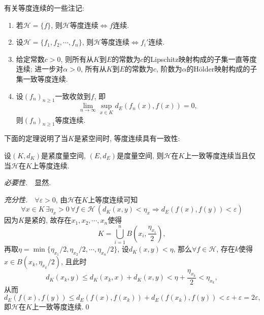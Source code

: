 	\begin{Remark}
	有关等度连续的一些注记:
	\begin{enumerate}[(1)]
	\item 若$ \mathcal H=\{f\} $, 则$ \mathcal H $等度连续$ \Longleftrightarrow f $连续.
	\item 设$ \mathcal H=\{ f_1,f_2,\cdots,f_n \} $, 则$ \mathcal H $等度连续$ \Longleftrightarrow f_i' $连续.
	\item 给定常数$ c>0 $, 则所有从$ K $到$ E $的常数为$ c $的Lipschitz映射构成的子集一直等度连续; 进一步对$ \alpha>0 $, 所有从$ K $到$ E $的常数为$ c $, 阶数为$ \alpha $的H\"older映射构成的子集一致等度连续.
	\item 设$ (f_n)_{n\geqslant 1} $一致收敛到$ f $, 即
	\[
	\lim_{n\to\infty}\sup_{x\in K}d_E(f_n(x),f(x))=0,
	\]
	则$ (f_n)_{n\geqslant 1} $等度连续.
	\end{enumerate}
	\end{Remark}
	
	下面的定理说明了当$ K $是紧空间时, 等度连续具有一致性:
	
	\begin{Theorem}
	设$ (K,d_K) $是紧度量空间, $ (E,d_E) $是度量空间, 则$ \mathcal H $在$ K $上一致等度连续当且仅当$ \mathcal{H} $在$ K $上等度连续.
	\end{Theorem}
	\begin{Proof}
	\textsl{必要性.}\ \ 显然.
	
	\textsl{充分性.}\ \ $ \forall\varepsilon>0 $, 由$ \mathcal H $在$ K $上等度连续可知
	\[
	\forall x\in K\,\exists\eta_x>0\,\forall f\in\mathcal H\,(d_K(x,y)<\eta_x\Rightarrow d_E(f(x),f(y))<\varepsilon)
	\]
	因为$ K $是紧的, 故存在$ x_1,x_2,\cdots,x_n $使得
	\[
	K=\bigcup_{i=1}^nB\left(x_i,\frac{\eta_{x_i}}{2}\right),
	\]
	再取$ \eta=\min\{ \eta_{x_1}/2,\eta_{x_2}/2,\cdots,\eta_{x_n}/2 \} $, 设$ d_K(x,y)<\eta $, 那么$ \forall f\in\mathcal H $, 存在$ k $使得$ x\in B(x_k,\eta_{x_k}/2) $, 且此时
	\[
	d_K(x_k,y)\leqslant d_K(x_k,x)+d_K(x,y)<\eta+\frac{\eta_{x_k}}{2}<\eta_{x_k},
	\]
	从而
	\[
	d_E(f(x),f(y))\leqslant d_E(f(x),f(x_k))+d_E(f(x_k),f(y))<\varepsilon+\varepsilon=2\varepsilon,
	\]
	即$ \mathcal H $在$ K $上一致等度连续.\qed
	\end{Proof}